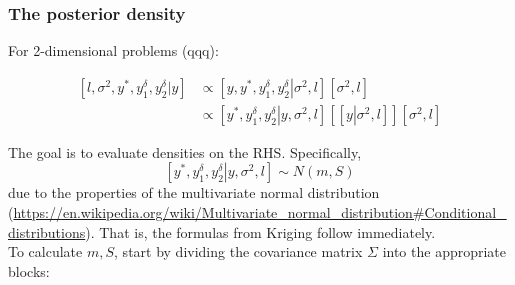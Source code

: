 \documentclass{sfuthesis}
\begin{document}
\subsubsection{The posterior density}

For 2-dimensional problems (qqq):

\begin{align}
\left[ {l,{\sigma ^2},{y^*},y_1^\delta ,y_2^\delta \left| y \right.} \right] &\propto \left[ {y,{y^*},y_1^\delta ,y_2^\delta \left| {{\sigma ^2},l} \right.} \right]\left[ {{\sigma ^2},l} \right]\\
 &\propto \left[ {{y^*},y_1^\delta ,y_2^\delta \left| {y,{\sigma ^2},l} \right.} \right]\left[ {\left[ {y\left| {{\sigma ^2},l} \right.} \right]} \right]\left[ {{\sigma ^2},l} \right]
\end{align}
      
The goal is to evaluate densities on the RHS. Specifically, 
\[\left[ {{y^*},y_1^\delta ,y_2^\delta \left| {y,{\sigma ^2},l} \right.} \right] \sim N\left( {m,S} \right)\]
due to the properties of the multivariate normal distribution (\url{https://en.wikipedia.org/wiki/Multivariate_normal_distribution#Conditional_distributions}). 
That is, the formulas from Kriging follow immediately.\\

To calculate $m, S$, start by dividing the covariance matrix $\Sigma$ into the appropriate blocks:
\end{document}
